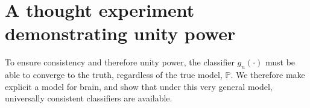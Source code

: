 \documentclass{article}
\newcommand{\PP}{\mathbb{P}}           %
\begin{document}


\section{A thought experiment demonstrating unity power} %
\label{sub:uc}


To ensure consistency and therefore unity power, the classifier $g_n(\cdot)$ must be able to converge to the truth, regardless of the true model, $\PP$.  We therefore make explicit a model for brain, and show that under this very general model, universally consistent classifiers are available.
\end{document}
